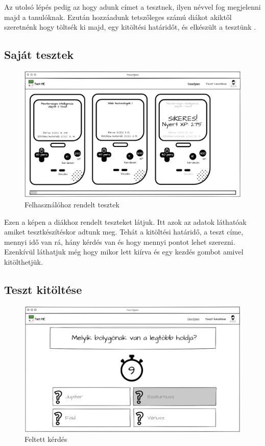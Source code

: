Az utolsó lépés pedig az hogy adunk címet a tesztnek, ilyen névvel fog megjelenni majd a tanulóknak. Ezután hozzáadunk tetszőleges számú diákot akiktől szeretnénk hogy töltsék ki majd, egy kitöltési határidőt, és elkészült a tesztünk .

\subsection{Saját tesztek}
\begin{figure}[H]
    \centering
    \includegraphics[width=\linewidth]{images/my_tests_wireframe.png}
    \caption{Felhasználóhoz rendelt tesztek}
    \label{fig:my_tests}
\end{figure}

Ezen a képen  a diákhoz rendelt teszteket látjuk. Itt azok az adatok láthatóak amiket tesztkészítéskor adtunk meg. Tehát a kitöltési határidő, a teszt címe, mennyi idő van rá, hány kérdés van és hogy mennyi pontot lehet szerezni. Ezenkívül láthatjuk még hogy mikor lett kiírva és egy kezdés gombot amivel kitölthetjük.

\subsection{Teszt kitöltése}

\begin{figure}[H]
    \centering
    \includegraphics[width=\linewidth]{images/test1_wireframe.png}
    \caption{Feltett kérdés}
    \label{fig:test_question}
\end{figure}

